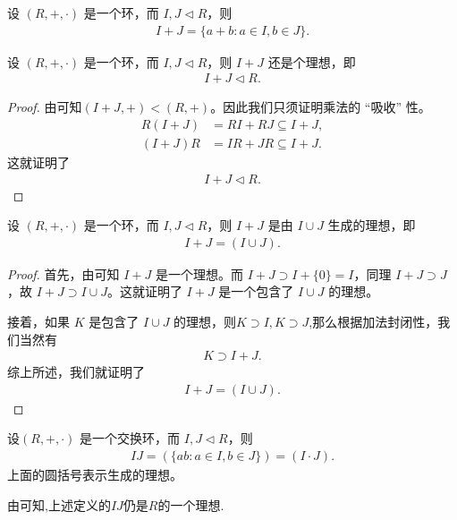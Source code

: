 \documentclass[../../main.tex]{subfiles}
\begin{document}
\begin{definition}[理想的加法]
设 $(R, +, \cdot)$ 是一个环，而 $I, J \lhd R$，则
\begin{align*}
I + J = \{a + b : a \in I, b \in J\}.
\end{align*}
\end{definition}

\begin{proposition}[理想的加法还是理想]\label{proposition:理想的加法还是理想}
设 $(R, +, \cdot)$ 是一个环，而 $I, J \lhd R$，则 $I + J$ 还是个理想，即
\begin{align*}
I + J \lhd R.
\end{align*}
\end{proposition}
\begin{proof}
由可知$(I+J,+)<(R,+)$。因此我们只须证明乘法的 “吸收” 性。
\begin{align*}
R(I + J) &= RI + RJ \subseteq I + J,\\
(I + J)R &= IR + JR \subseteq I + J.
\end{align*}
这就证明了
\begin{align*}
I + J \lhd R.
\end{align*} 

\end{proof}

\begin{proposition}
设 $(R, +, \cdot)$ 是一个环，而 $I, J \lhd R$，则 $I + J$ 是由 $I \cup J$ 生成的理想，即
\begin{align*}
I + J = (I \cup J) .
\end{align*}
\end{proposition}
\begin{proof}
首先，由可知 $I + J$ 是一个理想。而 $I + J \supset I + \{0\} = I$，同理 $I + J \supset J$，故 $I + J \supset I \cup J$。这就证明了 $I + J$ 是一个包含了 $I \cup J$ 的理想。

接着，如果 $K$ 是包含了 $I \cup J$ 的理想，则$K\supset I,K\supset J$,那么根据加法封闭性，我们当然有
\begin{align*}
K \supset I + J.
\end{align*}
综上所述，我们就证明了
\begin{align*}
I + J = (I \cup J).
\end{align*} 

\end{proof}

\begin{definition}[理想的乘法]
设$(R, +, \cdot)$ 是一个交换环，而 $I, J \lhd R$，则
\begin{align*}
IJ = (\{ab : a \in I, b \in J\})=(I\cdot J).
\end{align*}
上面的圆括号表示生成的理想。
\end{definition}
\begin{remark}
由可知,上述定义的$IJ$仍是$R$的一个理想.
\end{remark}
\end{document}
